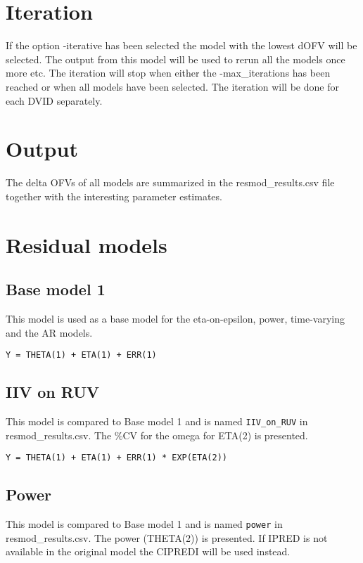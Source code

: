 \section{Iteration}
If the option -iterative has been selected the model with the lowest dOFV will be selected. The output from this model
will be used to rerun all the models once more etc. The iteration will stop when either the -max\_iterations has been
reached or when all models have been selected. The iteration will be done for each DVID separately.

\section{Output}
The delta OFVs of all models are summarized in the resmod\_results.csv file together with the interesting parameter estimates.

\section{Residual models}

\subsection{Base model 1}
This model is used as a base model for the eta-on-epsilon, power, time-varying and the AR models.

\begin{verbatim}
Y = THETA(1) + ETA(1) + ERR(1)
\end{verbatim}

\subsection{IIV on RUV}
This model is compared to Base model 1 and is named \verb|IIV_on_RUV| in resmod\_results.csv. The \%CV for the omega for ETA(2) is presented.

\begin{verbatim}
Y = THETA(1) + ETA(1) + ERR(1) * EXP(ETA(2))
\end{verbatim}

\subsection{Power}
This model is compared to Base model 1 and is named \verb|power| in resmod\_results.csv. The power (THETA(2)) is presented.
If IPRED is not available in the original model the CIPREDI will be used instead.

